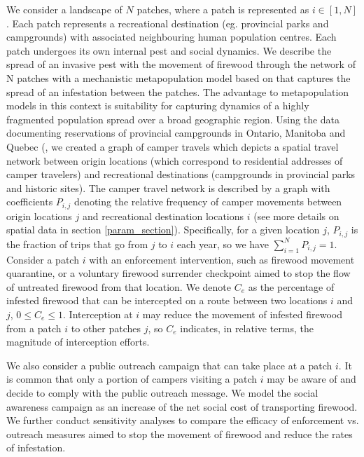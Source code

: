 We consider a landscape of $N$ patches, where a patch is represented as $i \in [1,N]$. Each patch represents a recreational destination (eg. provincial parks and campgrounds) with associated neighbouring human population centres. Each patch undergoes its own internal pest and social dynamics. We describe the spread of an invasive pest with the movement of firewood through the network of N patches with a mechanistic metapopulation model based on \cite{barlow2014modelling} that captures the spread of an infestation between the patches. The advantage to metapopulation models in this context is suitability for capturing dynamics of a highly fragmented population spread over a broad geographic region. Using the data documenting reservations of provincial campgrounds in Ontario, Manitoba and Quebec (\cite{yemshanov2015optimal}, we created a graph of camper travels which depicts a spatial travel network between origin locations (which correspond to residential addresses of camper travelers) and recreational destinations (campgrounds in provincial parks and historic sites). 
The camper travel network is described by a graph with coefficients $P_{i,j}$ denoting the relative frequency of camper movements between origin locations $j$ and recreational destination locations $i$ (see more details on spatial data in section \ref{param_section}). Specifically, for a given location $j$, $P_{i,j}$ is the fraction of trips that go from $j$ to $i$ each year, so we have $\sum_{i = 1}^N P_{i,j} = 1$.
Consider a patch $i$ with an enforcement intervention, such as firewood movement quarantine, or a voluntary firewood surrender checkpoint aimed to stop the flow of untreated firewood from that location. We denote $C_e$ as the percentage of infested firewood that can be intercepted on a route between two locations $i$ and $j$, $0 \leq C_e \leq 1$. Interception at $i$ may reduce the movement of infested firewood from a patch $i$ to other patches $j$, so $C_e$ indicates, in relative terms, the magnitude of interception efforts. 

We also consider a public outreach campaign that can take place at a patch $i$. It is common that only a portion of campers visiting a patch $i$ may be aware of and decide to comply with the public outreach message. We model the social awareness campaign as an increase of the net social cost of transporting firewood. We further conduct sensitivity analyses to compare the efficacy of enforcement vs. outreach measures aimed to stop the movement of firewood and reduce the rates of infestation.


